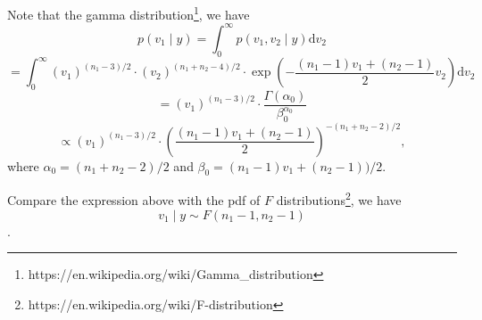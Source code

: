 \documentclass{article}
\begin{document}
{    Note that the gamma distribution\footnote{https://en.wikipedia.org/wiki/Gamma\_distribution}, we have 
    $$ p(v_1 \mid y) = \int_0^\infty {p(v_1, v_2 \mid y) \mathrm{d}v_2} $$
    $$= \int_0^\infty {(v_1)^{(n_1-3)/2} \cdot (v_2)^{(n_1+n_2-4)/2} \cdot \exp{\left( -\frac{(n_1-1)v_1 + (n_2-1)}{2} v_2 \right)} \mathrm{d}v_2}$$
    $$= (v_1)^{(n_1-3)/2} \cdot \frac{\Gamma(\alpha_0)}{\beta_0^{\alpha_0}}$$
    $$ \propto (v_1)^{(n_1-3)/2} \cdot \left(\frac{(n_1-1)v_1 + (n_2-1)}{2} \right)^{-(n_1+n_2-2)/2},$$
    where $\alpha_0 = (n_1+n_2-2)/2$ and $\beta_0 = (n_1-1)v_1 + (n_2-1))/2$.

    Compare the expression above with the pdf of $F$ distributions\footnote{https://en.wikipedia.org/wiki/F-distribution}, we have $$v_1 \mid y \sim F(n_1-1, n_2-1)$$.
}


\clearpage
\end{document}
